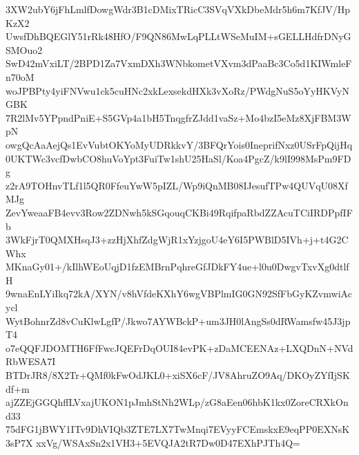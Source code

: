 3XW2ubY6jFhLmlfDowgWdr3B1cDMixTRicC3SVqVXkDbeMdr5h6m7KfJV/HpKzX2
UwsfDhBQEGlY51rRk48HfO/F9QN86MwLqPLLtWSeMuIM+sGELLHdfrDNyGSMOuo2
SwD42mVxiLT/2BPD1Za7VxmDXh3WNbkometVXvm3dPaaBc3Co5d1KIWmleFn70oM
woJPBPty4yiFNVwu1ck5cuHNc2xkLexsekdHXk3vXoRz/PWdgNuS5oYyHKVyNGBK
7R2lMv5YPpndPniE+S5GVp4a1bH5TnqgfrZJdd1vaSz+Mo4bzI5eMz8XjFBM3WpN
owgQcAaAejQs1EvVubtOKYoMyUDRkkvY/3BFQrYois0IneprifNxz0USrFpQijHq
0UKTWc3vcfDwbCO8huVoYpt3FuiTw1shU25HaSl/Koa4PgcZ/k9lI998MsPm9FDg
z2rA9TOHnvTLf1l5QR0FfeuYwW5pIZL/Wp9iQnMB08IJesufTPw4QUVqU08XfMJg
ZevYweaaFB4evv3Row2ZDNwh5kSGqouqCKBi49RqifpaRbdZZAcuTCiIRDPpfIFb
3WkFjrT0QMXHsqJ3+zzHjXhfZdgWjR1xYzjgoU4eY6I5PWBlD5IVh+j+t4G2CWhx
MKnaGy01+/kIlhWEoUqjD1fzEMBrnPqhreGfJDkFY4ue+l0u0DwgvTxvXg0dtlfH
9wnaEnLYiIkq72kA/XYN/v8hVfdeKXhY6wgVBPlmIG0GN92SfFbGyKZvmwiAcycl
WytBohnrZd8vCuKlwLgfP/Jkwo7AYWBckP+um3JH0lAngSs0dRWamsfw45J3jpT4
o7eQQFJDOMTH6FfFwcJQEFrDqOUI84evPK+zDaMCEENAz+LXQDnN+NVdRbWESA7I
BTDrJR8/8X2Tr+QMf0kFwOdJKL0+xiSX6cF/JV8AhruZO9Aq/DKOyZYfIjSKdf+m
ajZZEjGGQhffLVxajUKON1pJmhStNh2WLp/zG8aEen06hbK1kx0ZoreCRXkOnd33
75dFG1jBWY1ITv9DhVIQb3ZTE7LX7TwMnqi7EVyyFCEmskxE9eqPP0EXNsK3sP7X
xxVg/WSAxSn2x1VH3+5EVQJA2tR7Dw0D47EXhPJTh4Q=

